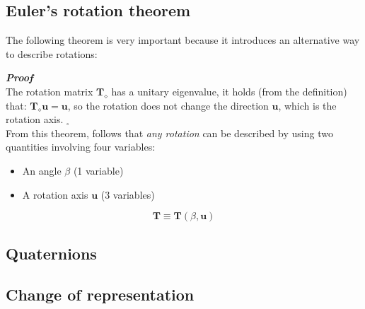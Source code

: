 \subsection{Euler's rotation theorem}
The following theorem is very important because it introduces an alternative way to describe rotations: \\

\hspace*{-5mm}
%

\vspace{0.5cm}
\noindent
\textbf{\textit{Proof}}\\
The rotation matrix $\mathbf{T}_{\diamond}$ has a unitary eigenvalue, it holds (from the definition) that: $\mathbf{T}_{\diamond}\mathbf{u}=\mathbf{u}$, so the rotation does not change the direction $\mathbf{u}$, which is the rotation axis. $_\square$\\

From this theorem, follows that \textit{any rotation} can be described by using two quantities involving four variables: 
\begin{itemize}
    \itemsep0em
    \item[\ding{70}] An angle $\beta$ (1 variable)
    \item[\ding{70}] A rotation axis $\mathbf{u}$ (3 variables)
\end{itemize}
\huge{
\begin{equation*}
    \mathbf{T} \equiv \mathbf{T}(\beta, \mathbf{u})
\end{equation*}}





\subsection{Quaternions}

\subsection{Change of representation}